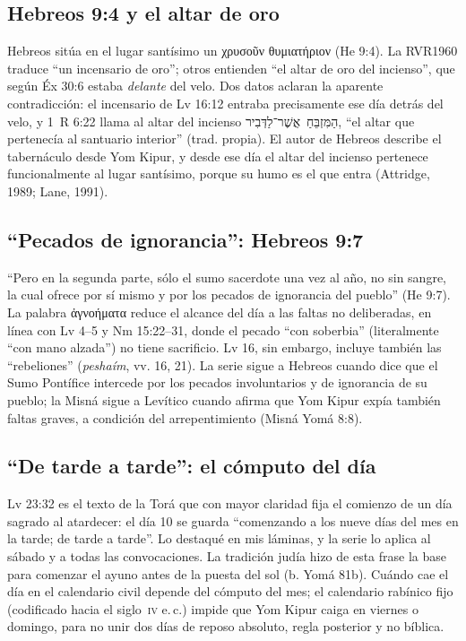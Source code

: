\documentclass[11pt,letterpaper]{article}
\newcommand{\heb}[1]{\mbox{\foreignlanguage{hebrew}{#1}}}
\newcommand{\grc}[1]{\foreignlanguage{ancientgreek}{#1}}
\begin{document}
\subsection{Hebreos 9:4 y el altar de oro}
Hebreos sitúa en el lugar santísimo un \grc{χρυσοῦν θυμιατήριον} (He 9:4). La RVR1960 traduce ``un incensario de oro''; otros entienden ``el altar de oro del incienso'', que según Éx 30:6 estaba \emph{delante} del velo. Dos datos aclaran la aparente contradicción: el incensario de Lv 16:12 entraba precisamente ese día detrás del velo, y 1~R 6:22 llama al altar del incienso \heb{הַמִּזְבֵּחַ אֲשֶׁר־לַדְּבִיר}, ``el altar que pertenecía al santuario interior'' (trad. propia). El autor de Hebreos describe el tabernáculo desde Yom Kipur, y desde ese día el altar del incienso pertenece funcionalmente al lugar santísimo, porque su humo es el que entra (Attridge, 1989; Lane, 1991).

\subsection{``Pecados de ignorancia'': Hebreos 9:7}
``Pero en la segunda parte, sólo el sumo sacerdote una vez al año, no sin sangre, la cual ofrece por sí mismo y por los pecados de ignorancia del pueblo'' (He 9:7). La palabra \grc{ἀγνοήματα} reduce el alcance del día a las faltas no deliberadas, en línea con Lv 4--5 y Nm 15:22--31, donde el pecado ``con soberbia'' (literalmente ``con mano alzada'') no tiene sacrificio. Lv 16, sin embargo, incluye también las ``rebeliones'' (\emph{peshaím}, vv. 16, 21). La serie sigue a Hebreos cuando dice que el Sumo Pontífice intercede por los pecados involuntarios y de ignorancia de su pueblo; la Misná sigue a Levítico cuando afirma que Yom Kipur expía también faltas graves, a condición del arrepentimiento (Misná Yomá 8:8).

\subsection{``De tarde a tarde'': el cómputo del día}
Lv 23:32 es el texto de la Torá que con mayor claridad fija el comienzo de un día sagrado al atardecer: el día 10 se guarda ``comenzando a los nueve días del mes en la tarde; de tarde a tarde''. Lo destaqué en mis láminas, y la serie lo aplica al sábado y a todas las convocaciones. La tradición judía hizo de esta frase la base para comenzar el ayuno antes de la puesta del sol (b. Yomá 81b). Cuándo cae el día en el calendario civil depende del cómputo del mes; el calendario rabínico fijo (codificado hacia el siglo~\textsc{iv} e.\,c.) impide que Yom Kipur caiga en viernes o domingo, para no unir dos días de reposo absoluto, regla posterior y no bíblica.
\end{document}
